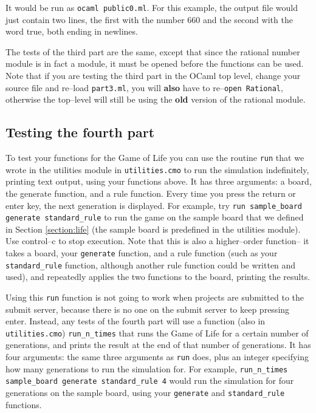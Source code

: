 \documentclass[11pt]{article}
\begin{document}
    \vspace{-1mm}

    It would be run as \texttt{ocaml public0.ml}.  For this example, the
  output file would just contain two lines, the first with the number 660
  and the second with the word true, both ending in newlines.

    The tests of the third part are the same, except that since the rational
  number module is in fact a module, it must be opened before the functions
  can be used.  Note that if you are testing the third part in the OCaml top
  level, change your source file and re--load \texttt{part3.ml}, you will
  \textbf{also} have to re--\texttt{open Rational}, otherwise the top--level
  will still be using the \textbf{old} version of the rational module.

  \subsection{Testing the fourth part}

    To test your functions for the Game of Life you can use the routine
  \texttt{run} that we wrote in the utilities module in
  \texttt{utilities.cmo} to run the simulation indefinitely, printing text
  output, using your functions above.  It has three arguments: a board, the
  generate function, and a rule function.  Every time you press the return
  or enter key, the next generation is displayed.  For example, try
  \texttt{run sample\_board generate standard\_rule} to run the game on the
  sample board that we defined in Section \ref{section:life} (the sample
  board is predefined in the utilities module).  Use control--c to stop
  execution.  Note that this is also a higher--order function-- it takes a
  board, your \texttt{generate} function, and a rule function (such as your
  \texttt{standard\_rule} function, although another rule function could be
  written and used), and repeatedly applies the two functions to the board,
  printing the results.

    Using this \texttt{run} function is not going to work when projects are
  submitted to the submit server, because there is no one on the submit
  server to keep pressing enter.  Instead, any tests of the fourth part will
  use a function (also in \texttt{utilities.cmo}) \texttt{run\_n\_times}
  that runs the Game of Life for a certain number of generations, and prints
  the result at the end of that number of generations.  It has four
  arguments: the same three arguments as \texttt{run} does, plus an integer
  specifying how many generations to run the simulation for.  For example,
  \texttt{run\_n\_times sample\_board generate standard\_rule 4} would run
  the simulation for four generations on the sample board, using your
  \texttt{generate} and \texttt{standard\_rule} functions.
\end{document}
